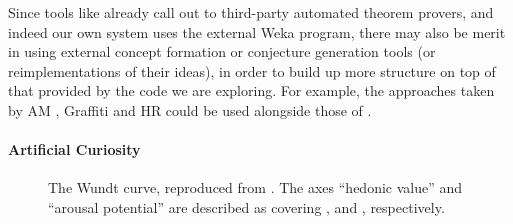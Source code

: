 Since tools like \hipspec{} already call out to third-party automated theorem
provers, and indeed our own \mlforhs{} system uses the external Weka program, there
may also be merit in using external concept formation or conjecture generation
tools (or reimplementations of their ideas), in order to build up more structure
on top of that provided by the code we are exploring. For example, the
approaches taken by AM \cite{lenat1977automated, lenat1979automated}, Graffiti
\cite{delavina2005some, delavina2005graffiti} and HR
\cite{colton1999automatic, colton2000agent} could be used alongside those of
\quickspec{}.

\paragraph{Artificial Curiosity} \label{sec:curiosity} \leavevmode \newline

\begin{figure}
  \centering

  \caption{The Wundt curve, reproduced from \cite{berlyne1970novelty}. The axes ``hedonic value'' and ``arousal potential'' are described as covering , and , respectively.}

  \label{fig:wundt}
\end{figure}

